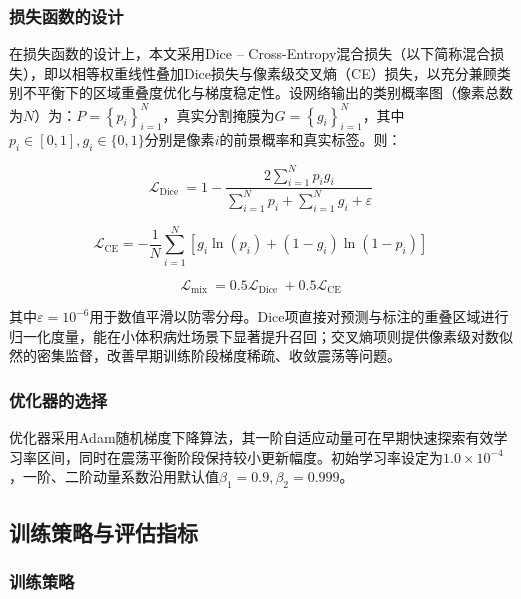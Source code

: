\subsubsection{损失函数的设计}

在损失函数的设计上，本文采用Dice – Cross-Entropy混合损失（以下简称混合损失），即以相等权重线性叠加Dice损失与像素级交叉熵（CE）损失，以充分兼顾类别不平衡下的区域重叠度优化与梯度稳定性。设网络输出的类别概率图（像素总数为$N$）为：$ P=\left\{p_{i}\right\}_{i=1}^{N} $，真实分割掩膜为$ G=\left\{g_{i}\right\}_{i=1}^{N} $，其中$ p_{i} \in[0,1], g_{i} \in\{0,1\}$分别是像素$i$的前景概率和真实标签。则：

\begin{equation}
    \mathcal{L}_{\text {Dice }}=1-\frac{2 \sum_{i=1}^{N} p_{i} g_{i}}{\sum_{i=1}^{N} p_{i}+\sum_{i=1}^{N} g_{i}+\varepsilon}
\end{equation}

\begin{equation}
    \mathcal{L}_{\mathrm{CE}}=-\frac{1}{N} \sum_{i=1}^{N}\left[g_{i} \ln \left(p_{i}\right)+\left(1-g_{i}\right) \ln \left(1-p_{i}\right)\right]
\end{equation}

\begin{equation}
    \mathcal{L}_{\text {mix }}=0.5 \mathcal{L}_{\text {Dice }}+0.5 \mathcal{L}_{\mathrm{CE}}
\end{equation}

其中$ \varepsilon=10^{-6} $用于数值平滑以防零分母。Dice项直接对预测与标注的重叠区域进行归一化度量，能在小体积病灶场景下显著提升召回；交叉熵项则提供像素级对数似然的密集监督，改善早期训练阶段梯度稀疏、收敛震荡等问题。

\subsubsection{优化器的选择}

优化器采用Adam随机梯度下降算法，其一阶自适应动量可在早期快速探索有效学习率区间，同时在震荡平衡阶段保持较小更新幅度。初始学习率设定为$ 1.0 \times 10^{-4} $，一阶、二阶动量系数沿用默认值$ \beta_{1}=0.9, \beta_{2}=0.999 $。

\subsection{训练策略与评估指标}

\subsubsection{训练策略}

